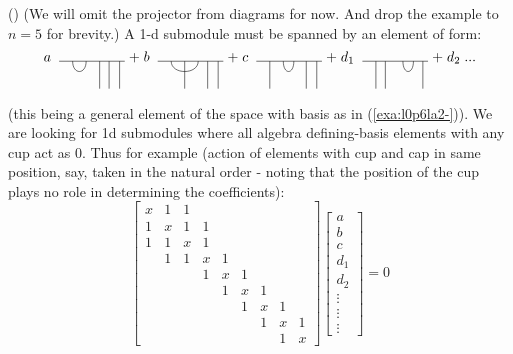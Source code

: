 \documentclass{article}
\theoremstyle{definition}
\newcommand{\mdef}{\refstepcounter{theorem}       \medskip \noindent ({\bf \thetheorem}) }
\numberwithin{equation}{subsection}
\begin{document}
\mdef  
(We will omit the projector from diagrams for now. And drop the example to $n=5$ for brevity.) 
A 1-d submodule must be spanned by an element of form:
\[ 
\rb{\;a\;} \begin{tikzpicture}[scale=0.68]
     \draw (0,0) -- (2.43,0) ;
     \draw (1.5,0) -- (1.5,-1);
     \draw (1.85,0) -- (1.85,-1);
     \draw (2.2385,0) -- (2.2385,-1);
     \draw (.5,0) .. controls (.5,-.5) and (1.0,-.5) .. (1,0) ;
 \end{tikzpicture}
 \rb{+\;b\;} \begin{tikzpicture}[scale=0.68]
     \draw (0,0) -- (2.43,0) ;
     \draw (1,0) -- (1,-1);
     \draw (1.85,0) -- (1.85,-1);
     \draw (2.2385,0) -- (2.2385,-1);
     \draw (.5,0) .. controls (.5,-.5) and (1.5,-.5) .. (1.5,0) ;
 \end{tikzpicture}
\rb{+\;c\;} \begin{tikzpicture}[scale=0.68]
     \draw (0,0) -- (2.43,0) ;
     \draw (.5,0) -- (.5,-1);
     \draw (1.85,0) -- (1.85,-1);
     \draw (2.2385,0) -- (2.2385,-1);
     \draw (1.,0) .. controls (1.,-.5) and (1.39,-.5) .. (1.39,0) ;
      \end{tikzpicture}
 \rb{+\;d_1\;} \begin{tikzpicture}[scale=0.68]
     \draw (0,0) -- (2.43,0) ;
     \draw (.5,0) -- (.5,-1);
     \draw (.85,0) -- (.85,-1);
     \draw (2.2385,0) -- (2.2385,-1);
     \draw (1.5,0) .. controls (1.5,-.5) and (1.89,-.5) .. (1.89,0) ;
 \end{tikzpicture}
  \rb{+\; d_2 \;...\;}
\]
(this being a general element of the space with basis as in (\ref{exa:l0p6la2-})).
We are looking for 1d submodules where all algebra defining-basis elements with any cup act as 0. 
Thus for example 
(action of elements with cup and cap in same position, say, taken in the natural order 
- noting that the position of the cup plays no role in determining the coefficients):
\[
\begin{bmatrix}
   x&1& 1 \\ 1&x&1 &1 \\ 1&1&x&1 \\ &1 &1&x&1 \\ &&& 1&x&1 \\ &&&& 1&x&1 \\  &&&&& 1&x&1 \\ &&&&&& 1&x&1 \\ &&&&&&&1&x
\end{bmatrix}
\begin{bmatrix}
    a \\ b \\ c \\ d_1 \\ d_2 \\ \vdots \\ \vdots \\ \vdots
\end{bmatrix}
=0
\]
\end{document}
